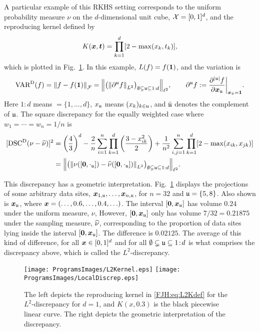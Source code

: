 \documentclass[graybox,footinfo]{svmult}
\begin{document}
A particular example of this RKHS setting corresponds to the uniform probability measure 
$\nu$ on the $d$-dimensional unit cube, ${\mathcal{X}} 
= 
[0,1]^d$, and the reproducing kernel defined by \cite{Hic97a}
\begin{equation} \label{FJH:eq:L2Kdef}
K(\bsx,\bst) =\prod_{k = 1}^d [2 - \max(x_k,t_k)],
\end{equation}
which is plotted in Fig.\ \ref{FJH:fig:L2ker}.  In this example, $L(f) = f({\boldsymbol{1}})$, and the 
variation is 
\begin{equation*}
\textup{VAR}^{\textup{D}}(f)  = \left \lVert f-f({\boldsymbol{1}}) \right \rVert_{\mathcal{F}} = \Bigl \lVert \bigl ( \left \lVert \partial^{\mathfrak{u}} 
f \right \rVert_{L^2}\bigr 
)_{\emptyset \subsetneq {\mathfrak{u}} \subseteq 1:d} \Bigr \rVert_{\ell^2} , \qquad 
\partial^{\mathfrak{u}} f : = \frac{\partial^{\lvert{\mathfrak{u}}\rvert} f}{\partial {\boldsymbol{x}}_{\mathfrak{u}}} \biggr 
\rvert_{{\boldsymbol{x}}_{\bar{{\mathfrak{u}}}} = {\boldsymbol{1}}}.
\end{equation*}
Here $1\!:\!d$ means  $= \{1, \ldots, d\}$, $x_{\mathfrak{u}}$ means $(x_k)_{k \in {\mathfrak{u}}}$, and 
$\bar{{\mathfrak{u}}}$ 
denotes the complement of ${\mathfrak{u}}$.  
The square discrepancy for the equally weighted case where $w_1 = \cdots = w_n = 1/n$ 
is
\begin{align}
\nonumber
[\disc^\Dt(\nu - \hnu)]^2  &= \left(\frac 43\right)^d - \frac{2}n \sum_{i=1}^n \prod_{k=1}^d 
\left (\frac{3 - x_{ik}^2}{2} \right) + \frac{1}{n^2}\sum_{i,j=1}^n \prod_{k = 1}^d [2 - 
\max(x_{ik},x_{jk})] 
\\ &= \Bigl \lVert \bigl ( \norm{\nu([\bszero,\cdot_\fraku]) - 
	\hnu([\bszero,\cdot_\fraku])}_{L^2}\bigr )_{\emptyset \subsetneq \fraku \subseteq 1:d} 
	\Bigr 
	\rVert_{\ell^2}. \label{FJH:eq:L2disc}
\end{align}

This discrepancy has a geometric interpretation. Fig.\ \ref{FJH:fig:L2ker} displays the 
projections of some arbitrary 
data sites, ${\boldsymbol{x}}_{1,{\mathfrak{u}}}, \ldots, {\boldsymbol{x}}_{n,{\mathfrak{u}}}$, for $n=32$ and ${\mathfrak{u}} = \{5,8\}$.  
Also 
shown is ${\boldsymbol{x}}_{\mathfrak{u}}$, where ${\boldsymbol{x}} = (\ldots, 0.6, \ldots, 0.4, \ldots)$. The interval 
$[{\boldsymbol{0}},{\boldsymbol{x}}_{\mathfrak{u}}]$ has volume $0.24$ under the uniform measure, $\nu$, However, 
$[{\boldsymbol{0}},{\boldsymbol{x}}_{\mathfrak{u}}]$ only has 
volume $7/32 = 0.21875$ under the sampling measure, $\widehat{\nu}$, corresponding to the 
proportion of data sites lying inside the interval $[{\boldsymbol{0}},{\boldsymbol{x}}_{\mathfrak{u}}]$. The difference is 
$0.02125$.  The average of this kind of difference, for all ${\boldsymbol{x}} \in [0,1]^d$ and for all 
$\emptyset \subsetneq {\mathfrak{u}} 
\subseteq 1\!:\!d$ is what comprises the discrepancy above, which is called the 
$L^2$-discrepancy. 
\begin{figure}
	\centering
	\texttt{[image: ProgramsImages/L2Kernel.eps]}\qquad
	\texttt{[image: ProgramsImages/LocalDiscrep.eps]}
	\caption{The left depicts the reproducing kernel in \eqref{FJH:eq:L2Kdef} for the 
	$L^2$-discrepancy 
	for $d=1$, and $K(x,0.3)$ is the black piecewise linear curve.  The right depicts the 
	geometric interpretation of the discrepancy.
	\label{FJH:fig:L2ker}}
\end{figure}
\end{document}
